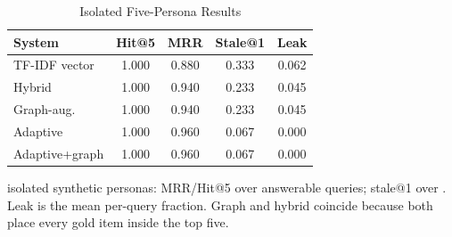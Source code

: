 \begin{table}[t]
\caption{Isolated Five-Persona Results}
\label{tab:multi}
\centering
\footnotesize
\setlength{\tabcolsep}{4pt}
\begin{tabular}{@{}lcccc@{}}
\toprule
\textbf{System} & \textbf{Hit@5} & \textbf{MRR} & \textbf{Stale@1} & \textbf{Leak} \\
\midrule
TF-IDF vector & 1.000 & 0.880 & 0.333 & 0.062 \\
Hybrid & 1.000 & 0.940 & 0.233 & 0.045 \\
Graph-aug. & 1.000 & 0.940 & 0.233 & 0.045 \\
Adaptive & 1.000 & 0.960 & 0.067 & 0.000 \\
Adaptive+graph & 1.000 & 0.960 & 0.067 & 0.000 \\
\bottomrule
\end{tabular}
\par\vspace{2pt}
\raggedright\scriptsize \PersonaCount{} isolated synthetic personas: MRR/Hit@5 over \PersonaAnswerable{} answerable queries; stale@1 over \PersonaQueries{}. Leak is the mean per-query fraction. Graph and hybrid coincide because both place every gold item inside the top five.
\end{table}
